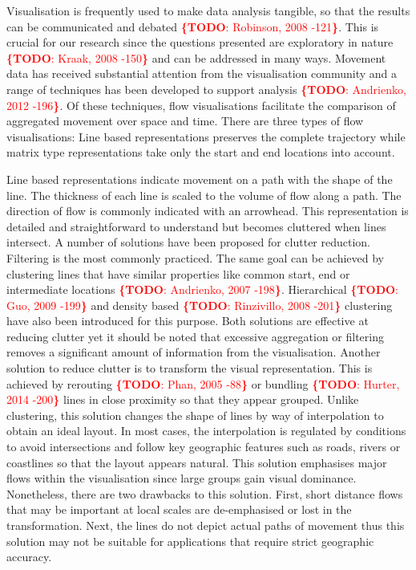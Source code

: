\documentclass{sig-alternate}
\newcommand{\todo}[1]{\noindent\textcolor{red}{{\bf \{TODO}: #1{\bf \}}}}
\begin{document}
Visualisation is frequently used to make data analysis tangible, so that the results can be communicated and debated \todo{Robinson, 2008 -121}. This is crucial for our research since the questions presented are exploratory in nature \todo{Kraak, 2008 -150} and can be addressed in many ways. Movement data has received substantial attention from the visualisation community and a range of techniques has been developed to support analysis \todo{Andrienko, 2012 -196}. Of these techniques, flow visualisations facilitate the comparison of aggregated movement over space and time. There are three types of flow visualisations: Line based representations preserves the complete trajectory while matrix type representations take only the start and end locations into account.

Line based representations indicate movement on a path with the shape of the line. The thickness of each line is scaled to the volume of flow along a path. The direction of flow is commonly indicated with an arrowhead. This representation is detailed and straightforward to understand but becomes cluttered when lines intersect. A number of solutions have been proposed for clutter reduction. Filtering is the most commonly practiced. The same goal can be achieved by clustering lines that have similar properties like common start, end or intermediate locations \todo{Andrienko, 2007 -198}. Hierarchical \todo{Guo, 2009 -199} and density based \todo{Rinzivillo, 2008 -201} clustering have also been introduced for this purpose. Both solutions are effective at reducing clutter yet it should be noted that excessive aggregation or filtering removes a significant amount of information from the visualisation. Another solution to reduce clutter is to transform the visual representation. This is achieved by rerouting \todo{Phan, 2005 -88} or bundling \todo{Hurter, 2014 -200} lines in close proximity so that they appear grouped. Unlike clustering, this solution changes the shape of lines by way of interpolation to obtain an ideal layout. In most cases, the interpolation is regulated by conditions to avoid intersections and follow key geographic features such as roads, rivers or coastlines so that the layout appears natural. This solution emphasises major flows within the visualisation since large groups gain visual dominance. Nonetheless, there are two drawbacks to this solution. First, short distance flows that may be important at local scales are de-emphasised or lost in the transformation. Next, the lines do not depict actual paths of movement thus this solution may not be suitable for applications that require strict geographic accuracy.
\end{document}
